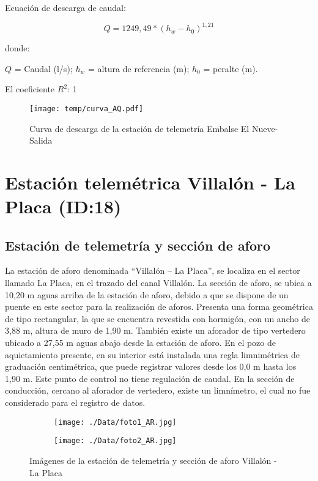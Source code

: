\documentclass[]{article}
\begin{document}
Ecuación de descarga de caudal:

\[Q = 1249,49*(h_w - h_0)^{1,21}\]

donde:

\(Q\) = Caudal (l/s); \(h_w\) = altura de referencia (m); \(h_0\) =
peralte (m).

El coeficiente \(R^2\): 1

\begin{figure}[H]
  \centering
  \texttt{[image: temp/curva\_AQ.pdf]}
\caption{Curva de descarga de la estación de telemetría Embalse El Nueve-Salida}
\label{fig:Curva_AQ}
\end{figure}

\clearpage
\section{Estación telemétrica Villalón - La Placa (ID:18)}

\subsection{Estación de telemetría y sección de aforo}

La estación de aforo denominada ``Villalón – La Placa'', se localiza en el sector llamado La Placa, en el trazado del canal Villalón. La sección de aforo, se ubica a 10,20 m aguas arriba de la estación de aforo, debido a que se dispone de un puente en este sector para la realización de aforos. Presenta una forma geométrica de tipo rectangular, la que se encuentra revestida con hormigón, con un ancho de 3,88 m, altura de muro de 1,90 m. También existe un aforador de tipo vertedero ubicado a 27,55 m aguas abajo desde la estación de aforo. En el pozo de aquietamiento presente, en su interior está instalada una regla limnimétrica de graduación centimétrica, que puede registrar valores desde los 0,0 m hasta los 1,90 m. Este punto de control no tiene regulación de caudal. En la sección de conducción, cercano al aforador de vertedero, existe un limnímetro, el cual no fue considerado para el registro de datos.

\begin{figure}[H]
  \centering
\begin{subfigure}{.49\textwidth}
  \texttt{[image: ./Data/foto1\_AR.jpg]}
\end{subfigure}
\hfill
\begin{subfigure}{.49\textwidth}
  \texttt{[image: ./Data/foto2\_AR.jpg]}
\end{subfigure}
\caption{Imágenes de la estación de telemetría y sección de aforo Villalón - La Placa}
\label{fig:fotos_18}
\end{figure}
\end{document}
